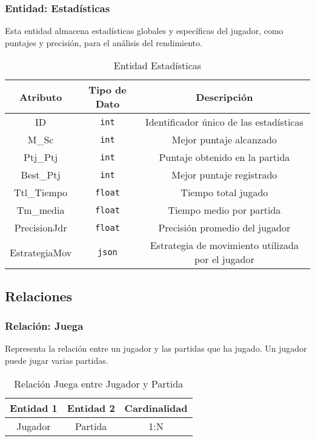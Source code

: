 \subsubsection{Entidad: Estadísticas}
Esta entidad almacena estadísticas globales y específicas del jugador, como puntajes y precisión, para el análisis del rendimiento.
\begin{table}[H]
\centering
\begin{tabular}{|c|c|c|}
\hline
\textbf{Atributo} & \textbf{Tipo de Dato} & \textbf{Descripción} \\ \hline
ID & \texttt{int} & Identificador único de las estadísticas \\ \hline
M\_Sc & \texttt{int} & Mejor puntaje alcanzado \\ \hline
Ptj\_Ptj & \texttt{int} & Puntaje obtenido en la partida \\ \hline
Best\_Ptj & \texttt{int} & Mejor puntaje registrado \\ \hline
Ttl\_Tiempo & \texttt{float} & Tiempo total jugado \\ \hline
Tm\_media & \texttt{float} & Tiempo medio por partida \\ \hline
PrecisionJdr & \texttt{float} & Precisión promedio del jugador \\ \hline
EstrategiaMov & \texttt{json} & Estrategia de movimiento utilizada por el jugador \\ \hline
\end{tabular}
\caption{Entidad Estadísticas}
\end{table}

\subsection{Relaciones}

\subsubsection{Relación: Juega}
Representa la relación entre un jugador y las partidas que ha jugado. Un jugador puede jugar varias partidas.
\begin{table}[H]
\centering
\begin{tabular}{|c|c|c|}
\hline
\textbf{Entidad 1} & \textbf{Entidad 2} & \textbf{Cardinalidad} \\ \hline
Jugador & Partida & 1:N \\ \hline
\end{tabular}
\caption{Relación Juega entre Jugador y Partida}
\end{table}

